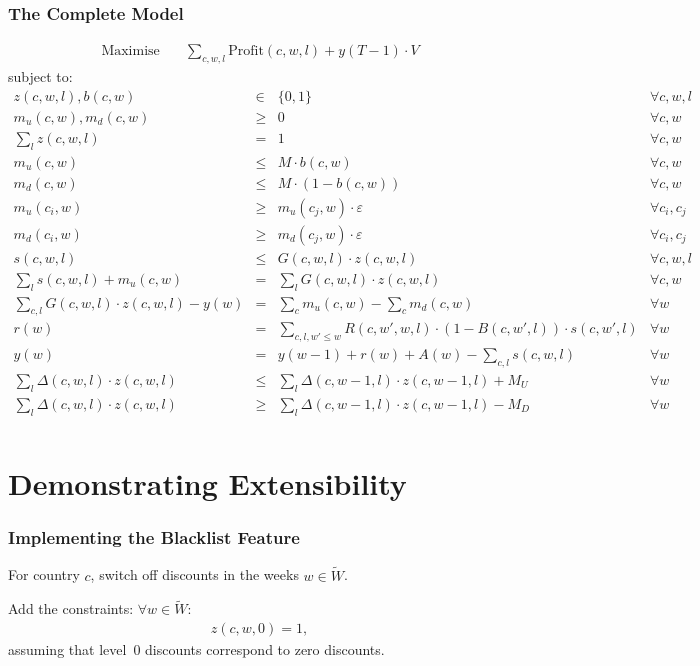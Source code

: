 \documentclass[xcolor=table]{beamer}
\begin{document}
\begin{frame}[t]
\frametitle{The Complete Model}
{\tiny
\begin{align*}
  \text{Maximise} & \quad \sum_{c, w, l} \text{Profit}(c, w, l) + y(T - 1) \cdot V 
\end{align*}
subject to:
  \[
\begin{array}{rcll}
  z(c, w, l), b(c, w) & \in & \{0, 1\} & \forall c, w, l \\
  m_u(c, w), m_d(c, w) & \geq & 0 & \forall  c, w\\
  \sum_{l} z(c, w, l) & = & 1 & \forall c, w\\
  m_u(c, w) & \leq & M \cdot b(c, w) & \forall c, w \\
  m_d(c, w) & \leq & M \cdot (1 - b(c, w)) & \forall  c, w\\
  m_u(c_i, w) & \geq & m_u(c_j, w) \cdot \varepsilon & \forall c_i, c_j \\
  m_d(c_i, w) & \geq & m_d(c_j, w) \cdot \varepsilon & \forall c_i, c_j \\
  s(c, w, l) & \leq & G(c, w, l) \cdot z(c, w, l) & \forall c, w, l \\
  \sum_{l} s(c, w, l) + m_u(c, w) & = & \sum_{l} G(c, w, l) \cdot z(c, w, l) &
  \forall c, w \\
  \sum_{c, l} G(c, w, l) \cdot z(c, w, l) - y(w) & = & \sum_{c} m_u(c, w) -
  \sum_{c} m_d(c, w)  & \forall w \\
  r(w) & = & \sum_{c, l, w' \leq w} R(c, w', w, l) \cdot (1 - B(c, w', l))
  \cdot s(c, w', l) &  \forall w\\
  y(w) & = & y(w - 1) + r(w) + A(w) - \sum_{c, l} s(c, w, l) & \forall w\\
   \sum_{l} \Delta(c, w, l) \cdot z(c, w, l) & \leq & \sum_{l} \Delta(c, w - 1,
  l) \cdot z(c, w - 1, l) +
    M_U & \forall  w\\
  \sum_{l} \Delta(c, w, l) \cdot z(c, w, l) & \geq & \sum_{l} \Delta(c, w - 1,
  l) \cdot z(c, w - 1, l) - M_D & \forall  w\\ 
\end{array} 
  \]
}
\end{frame}

\section{Demonstrating Extensibility}

\begin{frame}[t]
\frametitle{Implementing the Blacklist Feature}
  For country $c$, switch off discounts in the weeks $w \in \tilde{W}$.
 
\bigskip

  \pause

Add the constraints: $\forall w \in \tilde{W}$:
\begin{align*}
    z(c, w, 0) = 1,
\end{align*}
assuming that level~$0$ discounts correspond to zero discounts.
\end{frame}
\end{document}
